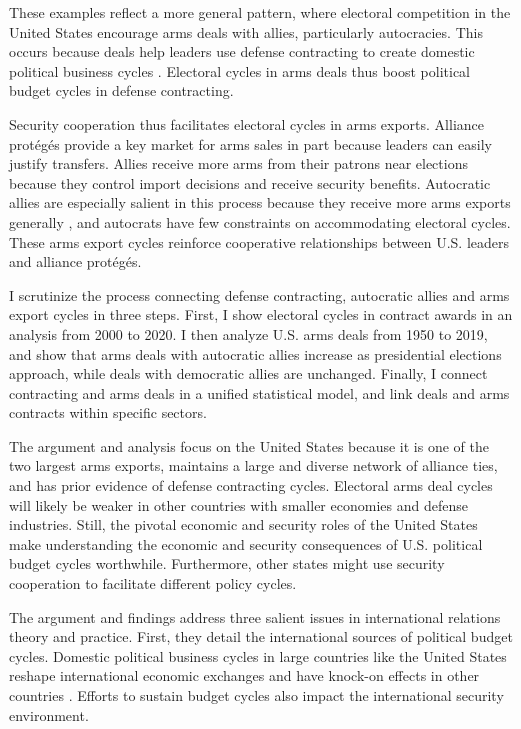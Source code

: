 \documentclass[12pt]{article}
\begin{document}
These examples reflect a more general pattern, where electoral competition in the United States encourage arms deals with allies, particularly autocracies.
This occurs because deals help leaders use defense contracting to create domestic political business cycles \citep{Tufte1978, Mintz1988, Mayer1995, DerouenHeo2000, Becker2021}. 
Electoral cycles in arms deals thus boost political budget cycles in defense contracting.


Security cooperation thus facilitates electoral cycles in arms exports. 
Alliance prot{\'e}g{\'e}s provide a key market for arms sales in part because leaders can easily justify transfers. 
Allies receive more arms from their patrons near elections because they control import decisions and receive security benefits. 
Autocratic allies are especially salient in this process because they receive more arms exports generally \citep{McManusYarhi-Milo2017}, and autocrats have few constraints on accommodating electoral cycles.
These arms export cycles reinforce cooperative relationships between U.S. leaders and alliance prot{\'e}g{\'e}s. 


I scrutinize the process connecting defense contracting, autocratic allies and arms export cycles in three steps. 
First, I show electoral cycles in contract awards in an analysis from 2000 to 2020.
I then analyze U.S. arms deals from 1950 to 2019, and show that arms deals with autocratic allies increase as presidential elections approach, while deals with democratic allies are unchanged. 
Finally, I connect contracting and arms deals in a unified statistical model, and link deals and arms contracts within specific sectors.


The argument and analysis focus on the United States because it is one of the two largest arms exports, maintains a large and diverse network of alliance ties, and has prior evidence of defense contracting cycles. 
Electoral arms deal cycles will likely be weaker in other countries with smaller economies and defense industries. 
Still, the pivotal economic and security roles of the United States make understanding the economic and security consequences of U.S. political budget cycles worthwhile.
Furthermore, other states might use security cooperation to facilitate different policy cycles. 


The argument and findings address three salient issues in international relations theory and practice. 
First, they detail the international sources of political budget cycles. 
Domestic political business cycles in large countries like the United States reshape international economic exchanges and have knock-on effects in other countries \citep{Kayser2006, Kayser2009}.
Efforts to sustain budget cycles also impact the international security environment. 
\end{document}
